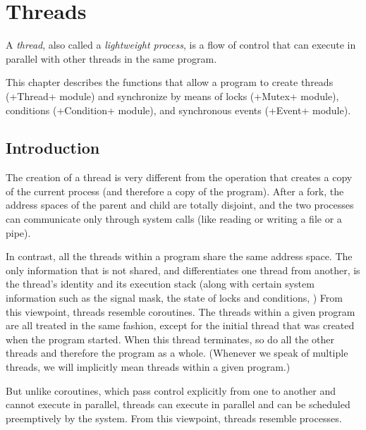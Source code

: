 %
%

\chapter{\label{sec/coprocessus}Threads}

A \emph{thread}, also called a \emph{lightweight process}, is a flow
of control that can execute in parallel with other threads in the same
program.

This chapter describes the functions that allow a program to create
threads (\ml+Thread+ module) and synchronize by means of locks
(\ml+Mutex+ module), conditions (\ml+Condition+ module), and
synchronous events (\ml+Event+ module).

\section{Introduction}

The creation of a thread is very different from the 
operation that creates a copy of the current process (and therefore a
copy of the program). After a fork, the address spaces of the parent
and child are totally disjoint, and the two processes can communicate
only through system calls (like reading or writing a file or a pipe).

In contrast, all the threads within a program share the same address
space. The only information that is not shared, and differentiates one
thread from another, is the thread's identity and its execution stack
(along with certain system information such as the signal mask, the
state of locks and conditions, \etc) From this viewpoint, threads
resemble coroutines. The threads within a given program are all
treated in the same fashion, except for the initial thread that was
created when the program started. When this thread terminates, so do
all the other threads and therefore the program as a whole. (Whenever
we speak of multiple threads, we will implicitly mean threads within a
given program.)

But unlike coroutines, which pass control explicitly from one to another
and cannot execute in parallel, threads can execute in parallel and
can be scheduled preemptively by the system. From this viewpoint,
threads resemble processes.

